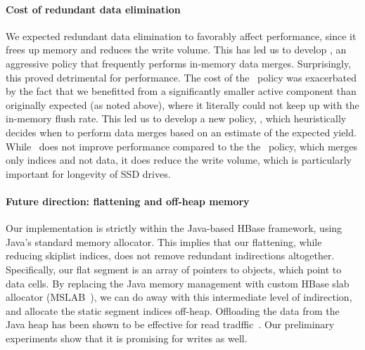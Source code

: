 \paragraph{Cost of redundant data elimination}
We expected redundant data elimination to favorably affect performance, since it frees up memory and reduces the write volume.
This has led us to develop \eager, an aggressive policy that frequently performs in-memory data merges. 
Surprisingly, this proved detrimental for performance. The cost of the \eager\ policy was exacerbated by the 
fact that we benefitted from a significantly smaller active component than originally expected (as noted above),  
where it literally could not keep up with the in-memory flush rate. 
This led us to develop a new policy, \adp, which heuristically decides when to perform data merges based on 
an estimate of the expected yield. 
While \adp\ does not improve performance compared to the the \basic\ policy, which merges only indices and not data,
it does reduce the write volume, which is particularly important for longevity of SSD drives.
 
\paragraph{Future direction: flattening and off-heap memory}
Our implementation is strictly within the Java-based HBase framework, using Java's standard memory allocator.
This implies that our flattening, while reducing skiplist indices, does not remove redundant indirections altogether.
Specifically, our flat segment is an array of pointers to objects, which point to data cells. 
By replacing the Java memory management with custom HBase slab allocator 
(MSLAB~\cite{hbasemslab}), we can do away with this intermediate level of indirection, 
and allocate the static segment indices off-heap. Offloading the data from the Java heap
has been shown to be effective for read tradffic~\cite{alibabahbase}. 
Our preliminary experiments show that it is promising  for writes as well.  

